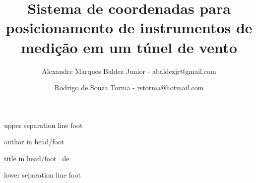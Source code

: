 \usepackage[utf8]{inputenc}
\usepackage{amsmath,amssymb}
\usepackage[brazil]{varioref}
\usepackage[english,brazil]{babel}
\usepackage{graphicx}
\usepackage{listings}
\usepackage{url}
\usepackage{colortbl}
\usepackage{setspace}
\usepackage{multimedia}



\beamertemplatetransparentcovereddynamic
\newcommand{\frameofframes}{/}
\newcommand{\setframeofframes}[1]{\renewcommand{\frameofframes}{#1}}
\setframeofframes{de}
\makeatletter
{}
  {%
    \begin{beamercolorbox}[colsep=1.5pt]{upper separation line foot}
    \end{beamercolorbox}
    \begin{beamercolorbox}[ht=2.5ex,dp=1.125ex,%
      leftskip=.3cm,rightskip=.3cm plus1fil]{author in head/foot}%
      \hfill%
      {\insertshortinstitute}%
    \end{beamercolorbox}%
    \begin{beamercolorbox}[ht=2.5ex,dp=1.125ex,%
      leftskip=.3cm,rightskip=.3cm plus1fil]{title in head/foot}%
      {\insertshorttitle}%
      \hfill%
      {\insertframenumber~\frameofframes~\inserttotalframenumber}
    \end{beamercolorbox}%
    \begin{beamercolorbox}[colsep=1.5pt]{lower separation line foot}
    \end{beamercolorbox}
  }
\makeatother
\title[Sistema de coordenadas para posicionamento de instrumentos de medição em um túnel de vento]
{\normalsize Sistema de coordenadas para posicionamento de instrumentos de medição em um túnel de vento}
\author[Baldez Jr, Torma]{Alexandre Marques Baldez Junior - abaldezjr@gmail.com \and Rodrigo de Souza Torma - rstorma@hotmail.com}
